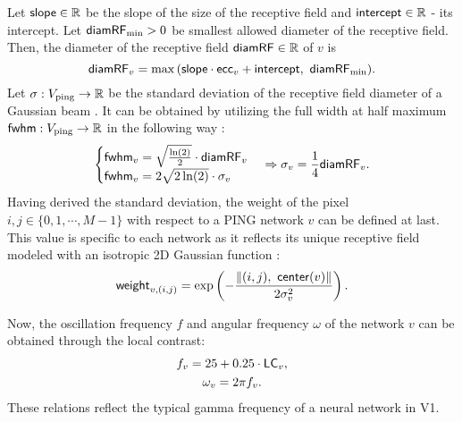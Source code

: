 Let $\mathsf{slope} \in \mathbb{R}$ be the slope of the size of the receptive field and $\mathsf{intercept} \in \mathbb{R}$ - its intercept. 
Let $\mathsf{diamRF}_{\min} > 0$ be smallest allowed diameter of the receptive field. 
Then, the diameter of the receptive field $\mathsf{diamRF} \in \mathbb{R}$ of $v$ is 
\begin{equation}
    \mathsf{diamRF}_v = \max{( \mathsf{slope}\cdot \mathsf{ecc}_v + \mathsf{intercept}, \ \mathsf{diamRF}_{\min} )}.
\end{equation}
Let $\sigma: V_{\mathrm{ping}} \to \mathbb{R}$ be the standard deviation of the receptive field diameter of a Gaussian beam . It can be obtained by utilizing the full width at half maximum $\mathsf{fwhm}: V_{\mathrm{ping}} \to \mathbb{R}$ in the following way \cite{MaryamPLACEHOLDER}:
\begin{equation}
    \begin{cases}
        \mathsf{fwhm}_v = \sqrt{\frac{\ln(2)}{2}} \cdot \mathsf{diamRF}_v \\
        \mathsf{fwhm}_v = 2 \sqrt{2 \ln(2)} \cdot \sigma_v
    \end{cases}
    \Rightarrow 
    \sigma_v = \frac{1}{4} \mathsf{diamRF}_v.
\end{equation}
Having derived the standard deviation, the weight of the pixel $i, j \in \{ 0, 1, \cdots, M-1 \}$ with respect to a PING network $v$ can be defined at last. This value is specific to each network as it reflects its unique receptive field modeled with an isotropic 2D Gaussian function \cite{MaryamPLACEHOLDER}:
\begin{equation}
    \mathsf{weight}_{v, (i, j)} = \exp \left(
        -\frac{\| (i, j), \ \mathsf{center}(v) \|}{ 2 \sigma_v^2 }
    \right).
    \label{eq:weight-pixel-network}
\end{equation}

Now, the oscillation  frequency $f$ and angular frequency $\omega$ of the network $v$ can be obtained through the local contrast:
\begin{gather}
    f_v = 25 + 0.25 \cdot \mathsf{LC}_v, \\
    \omega_v = 2 \pi f_v.
\end{gather}
These relations reflect the typical gamma frequency of a neural network in V1.
\\ 


